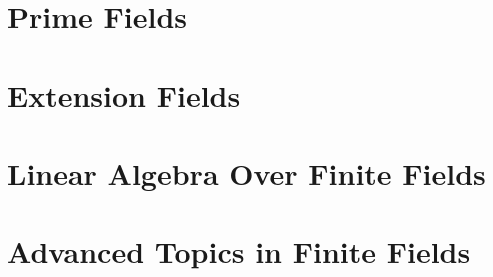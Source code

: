 


\section{Prime Fields}
\label{sec:finite:fields}





\bigskip




\clearpage







\section{Extension Fields}
\label{sec:extension:fields}





\bigskip




\clearpage


\section{Linear Algebra Over Finite Fields}
\label{sec:linear:algebra}






\bigskip
\clearpage


\section{Advanced Topics in Finite Fields}
\label{sec:finite:field:advanced}






\bigskip
\clearpage




%





